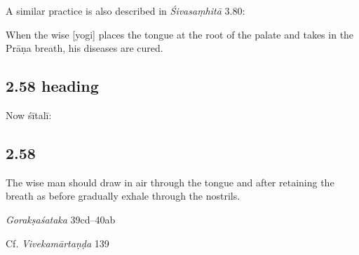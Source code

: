 \begin{ekdosis}
\begin{philcomm}[hp02_057]
A similar practice is also described in \emph{Śivasaṃhitā} 3.80:

\begin{versinnote}
When the wise [yogi] places the tongue at the root of the palate and takes in the Prāṇa breath, his diseases are cured.
\end{versinnote}
\begin{versinnote}
\end{versinnote}

\end{philcomm}

\subsection*{2.58 heading}
\begin{translation}[hp02_058a]
Now śītalī:
\end{translation}


\subsection*{2.58}
\begin{translation}[hp02_058]
The wise man should draw in air through the tongue and after retaining the breath as before gradually exhale through the nostrils.
\end{translation}

\begin{sources}[hp02_058]
\emph{Gorakṣaśataka} 39cd–40ab

\begin{versinnote}
\end{versinnote}

Cf. \emph{Vivekamārtaṇḍa} 139
\begin{versinnote}
\end{versinnote}
\end{sources}


\end{ekdosis}
